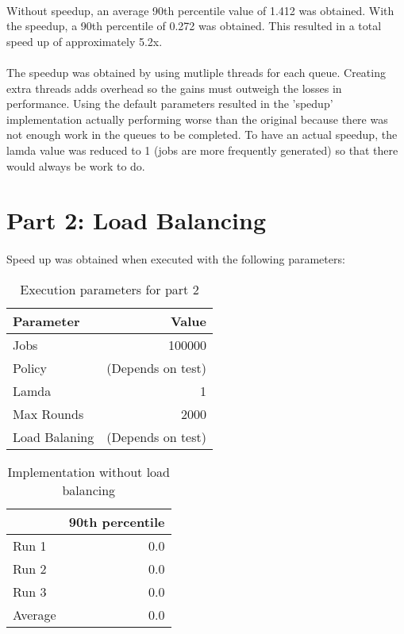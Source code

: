 \documentclass[12pt]{article}
\begin{document}
\paragraph{} Without speedup, an average 90th percentile value of 1.412 was obtained. With the speedup, a 90th percentile of 0.272 was obtained. This resulted in a total speed up of approximately 5.2x.

\paragraph{} The speedup was obtained by using mutliple threads for each queue. Creating extra threads adds overhead so the gains must outweigh the losses in performance. Using the default parameters resulted in the 'spedup' implementation actually performing worse than the original because there was not enough work in the queues to be completed. To have an actual speedup, the lamda value was reduced to 1 (jobs are more frequently generated) so that there would always be work to do.


\section*{Part 2: Load Balancing}

\paragraph{} Speed up was obtained when executed with the following parameters:
\begin{table}[H]
  \centering
  \begin{tabular}{lr}
    {\bf Parameter} & {\bf Value} \\
    \hline
    Jobs & 100000 \\
    Policy & (Depends on test) \\
    Lamda & 1 \\
    Max Rounds & 2000 \\
    Load Balaning & (Depends on test) \\
  \end{tabular}
  \caption{Execution parameters for part 2}
  \label{tbl-part2-params}
\end{table}

\begin{table}[H]
  \centering
  \begin{tabular}{lr}
    & {\bf 90th percentile} \\
    \hline
    Run 1 & 0.0 \\
    Run 2 & 0.0 \\
    Run 3 & 0.0 \\
    \hline
    Average & 0.0 \\
  \end{tabular}
  \caption{Implementation without load balancing}
  \label{tbl-part2-originall}
\end{table}
\end{document}
